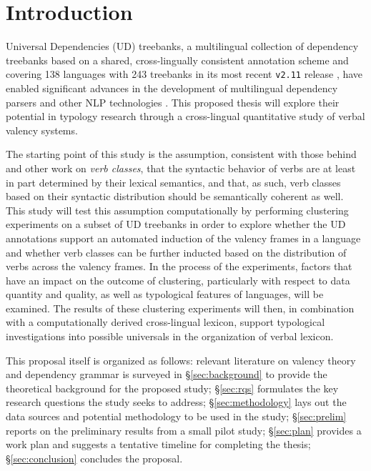 \section{Introduction}\label{sec:intro}

Universal Dependencies (UD) treebanks, a multilingual collection of dependency treebanks based on a shared, cross-lingually consistent annotation scheme \citep{nivre2020} and covering 138 languages with 243 treebanks in its most recent \texttt{v2.11} release \citep{universaldep}, have enabled significant advances in the development of multilingual dependency parsers and other NLP technologies \citep{zeman2017, zeman2018}. This proposed thesis will explore their potential in typology research through a cross-lingual quantitative study of verbal valency systems.

The starting point of this study is the assumption, consistent with those behind \citet{levin1993} and other work on \textit{verb classes}, that the syntactic behavior of verbs are at least in part determined by their lexical semantics, and that, as such, verb classes based on their syntactic distribution should be semantically coherent as well. This study will test this assumption computationally by performing clustering experiments on a subset of UD treebanks in order to explore whether the UD annotations support an automated induction of the valency frames in a language and whether verb classes can be further inducted based on the distribution of verbs across the valency frames. In the process of the experiments, factors that have an impact on the outcome of clustering, particularly with respect to data quantity and quality, as well as typological features of languages, will be examined. The results of these clustering experiments will then, in combination with a computationally derived cross-lingual lexicon, support typological investigations into possible universals in the organization of verbal lexicon.

This proposal itself is organized as follows: relevant literature on valency theory and dependency grammar is surveyed in \S\ref{sec:background} to provide the theoretical background for the proposed study; \S\ref{sec:rqs} formulates the key research questions the study seeks to address; \S\ref{sec:methodology} lays out the data sources and potential methodology to be used in the study; \S\ref{sec:prelim} reports on the preliminary results from a small pilot study; \S\ref{sec:plan} provides a work plan and suggests a tentative timeline for completing the thesis; \S\ref{sec:conclusion} concludes the proposal.